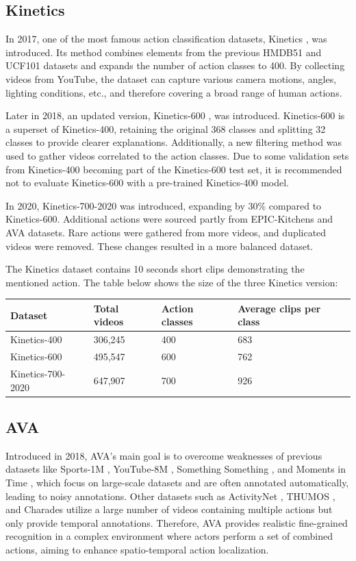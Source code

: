 \documentclass[a4paper]{article}
\begin{document}
\subsection{Kinetics}
In 2017, one of the most famous action classification datasets, Kinetics \cite{Kinetics-400}, was introduced. Its method combines elements from the previous HMDB51 \cite{HMDB51} and UCF101 \cite{UCF101}datasets and expands the number of action classes to 400. By collecting videos from YouTube, the dataset can capture various camera motions, angles, lighting conditions, etc., and therefore covering a broad range of human actions.

Later in 2018, an updated version, Kinetics-600 \cite{Kinetics-600}, was introduced. Kinetics-600 is a superset of Kinetics-400, retaining the original 368 classes and splitting 32 classes to provide clearer explanations. Additionally, a new filtering method was used to gather videos correlated to the action classes. Due to some validation sets from Kinetics-400 becoming part of the Kinetics-600 test set, it is recommended not to evaluate Kinetics-600 with a pre-trained Kinetics-400 model.

In 2020, Kinetics-700-2020 \cite{Kinetics-700-2020} was introduced, expanding by 30\% compared to Kinetics-600. Additional actions were sourced partly from EPIC-Kitchens and AVA datasets. Rare actions were gathered from more videos, and duplicated videos were removed. These changes resulted in a more balanced dataset.

The Kinetics dataset contains 10 seconds short clips demonstrating the mentioned action. The table below shows the size of the three Kinetics version:
\begin{center}
	\begin{tabular}{| l | l | l | l |}
		\hline
		Dataset & Total videos & Action classes & Average clips per class \\ \hline
		Kinetics-400 & 306,245 & 400 & 683\\ \hline
		Kinetics-600 & 495,547 & 600 & 762\\ \hline
		Kinetics-700-2020 & 647,907 & 700 &  926\\ \hline
	\end{tabular}
\end{center}

\subsection{AVA}
Introduced in 2018, AVA's \cite{AVA} main goal is to overcome weaknesses of previous datasets like Sports-1M \cite{Sports1M}, YouTube-8M \cite{YouTube8M}, Something Something \cite{SomethingV1}, and Moments in Time \cite{MomentsinTime}, which focus on large-scale datasets and are often annotated automatically, leading to noisy annotations. Other datasets such as ActivityNet \cite{ActivityNet}, THUMOS \cite{THUMOS}, and Charades utilize a large number of videos containing multiple actions but only provide temporal annotations. Therefore, AVA provides realistic fine-grained recognition in a complex environment where actors perform a set of combined actions, aiming to enhance spatio-temporal action localization.
\end{document}
